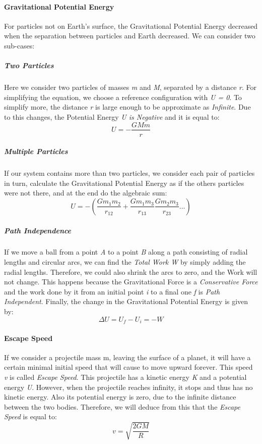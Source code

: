 \documentclass{scrartcl}
\begin{document}
	\paragraph{Gravitational Potential Energy} For particles not on Earth's surface, the Gravitational Potential Energy decreased when the separation between particles and Earth decreased. We can consider two sub-cases:
	\subparagraph{Two Particles} Here we consider two particles of masses {\em m} and {\em M}, separated by a distance {\em r}. For simplifying the equation, we choose a reference configuration with {\em U = 0}. To simplify more, the 						      distance {\em r} is large enough to be approximate as {\em Infinite}. Due to this changes, the Potential Energy {\em U is Negative} and it is equal to:
						      \begin{equation}
						      {U} = -\frac{GMm}{r} 
						      \end{equation}
	\subparagraph{Multiple Particles} If our system contains more than two particles, we consider each pair of particles in turn, calculate the Gravitational Potential Energy as if the others particles were not there, and at the end do the 							    algebraic sum:
						       \begin{equation}
						      {U} = -(\frac{Gm_1m_2}{r_12} + \frac{Gm_1m_3}{r_13} \frac{Gm_2m_3}{r_23}   ...) 
						      \end{equation}
	\subparagraph{Path Independence} If we move a ball from a point {\em A} to a point {\em B} along a path consisting of radial lengths and circular arcs, we can find the {\em Total Work W}  by simply adding the radial lengths. 									Therefore, we could also shrink the arcs to zero, and the Work will not change. This happens because the Gravitational Force is a {\em Conservative Force} and the work done by it from an initial 								point {\em i} to a final one {\em f}  is {\em Path Independent}. 
								Finally, the change in the Gravitational Potential Energy is given by:  \begin{equation}
												\Delta U = {U_f - U_i} = -W
												\end{equation}
	   

	\paragraph{Escape Speed} If we consider a projectile mass m, leaving the surface of a planet, it will have a certain minimal initial speed that will cause to move upward forever. This speed {\em v} is called {\em Escape Speed}. 		\newline This projectile has a kinetic energy  {\em K}  and a potential energy  {\em U}. However, when the projectile reaches infinity, it stops and thus has no kinetic energy. Also its potential energy is zero, due to the infinite distance between the two bodies. Therefore, we will deduce from this that the {\em Escape Speed } is equal to: 
	\begin{equation}
	{v} =  \sqrt{\frac{2GM}{R}} 
	\end{equation}

    
    
\end{document}

